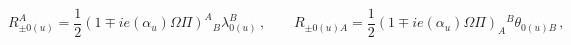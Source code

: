 \begin{equation}
R_{\pm 0(u)}^A=\frac{1}{2}(1\mp i e(\alpha_u)\Omega\Pi)^A{}_B\lambda_{0(u)}^B\,,\qquad
R_{\pm 0(u)A}=\frac{1}{2}(1\mp i e(\alpha_u)\Omega\Pi)_A{}^B\theta_{0(u)B}\,,
\end{equation}

